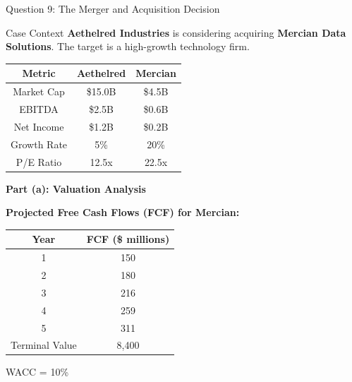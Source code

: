 \documentclass[aspectratio=169]{beamer}
\newcommand{\question}[1]{{\large\bfseries\color{crimson}#1}}
\begin{document}
	\begin{frame}{Question 9: The Merger and Acquisition Decision}
		\begin{block}{Case Context}
			\textbf{Aethelred Industries} is considering acquiring \textbf{Mercian Data Solutions}. The target is a high-growth technology firm.
		\end{block}
		
		\begin{table}[h]
			\centering
			\begin{tabular}{|c|c|c|}
				\hline
				\textbf{Metric} & \textbf{Aethelred} & \textbf{Mercian} \\
				\hline
				Market Cap & \$15.0B & \$4.5B \\
				EBITDA & \$2.5B & \$0.6B \\
				Net Income & \$1.2B & \$0.2B \\
				Growth Rate & 5\% & 20\% \\
				P/E Ratio & 12.5x & 22.5x \\
				\hline
			\end{tabular}
		\end{table}
		
		\question{Part (a): Valuation Analysis}
		
		\textbf{Projected Free Cash Flows (FCF) for Mercian:}
		
		\begin{table}[h]
			\centering
			\begin{tabular}{|c|c|}
				\hline
				\textbf{Year} & \textbf{FCF (\$ millions)} \\
				\hline
				1 & 150 \\
				2 & 180 \\
				3 & 216 \\
				4 & 259 \\
				5 & 311 \\
				Terminal Value & 8,400 \\
				\hline
			\end{tabular}
		\end{table}
		
		WACC = 10\%
	\end{frame}
	
\end{document}
